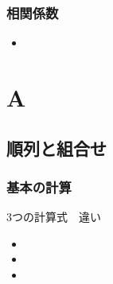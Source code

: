 \documentclass[10pt,dvipdfmx]{jsarticle}
\begin{document}
\subsubsection*{相関係数}
\begin{LARGE}
  \begin{itemize}
    \item
  \end{itemize}
\end{LARGE}

\newpage
\section*{A}
\subsection*{順列と組合せ}
\subsubsection*{基本の計算}
\begin{itembox}[l]{3つの計算式　違い}
  \begin{multicols}{3}
    \begin{itemize}
      \item \item \item
    \end{itemize}
  \end{multicols}
\end{itembox}
\end{document}
